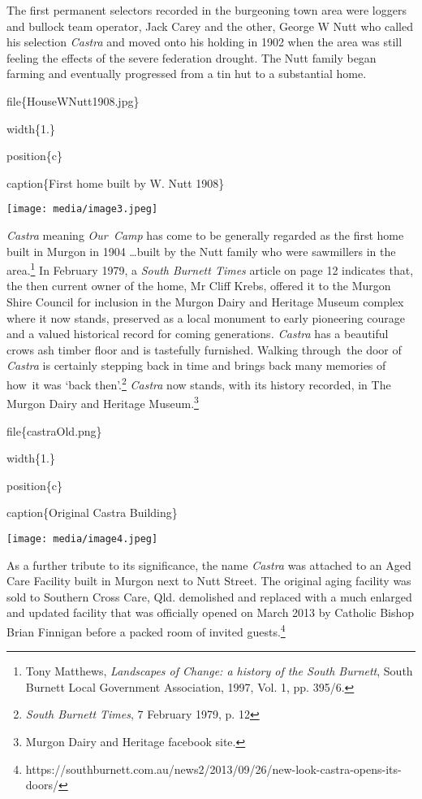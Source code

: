 The first permanent selectors recorded in the burgeoning town area were loggers and bullock team operator, Jack Carey and the other, George W Nutt who called his selection \emph{Castra} and moved onto his holding in 1902 when the area was still feeling the effects of the severe federation drought. The Nutt family began farming and eventually progressed from a tin hut to a substantial home.

file\{HouseWNutt1908.jpg\}

width\{1.\}

position\{c\}

caption\{First home built by W. Nutt 1908\}

\texttt{[image: media/image3.jpeg]}

\emph{Castra} meaning \emph{Our~Camp} has come to be generally regarded as the first home built in Murgon in 1904 \ldots built by the Nutt family who were sawmillers in the area.\footnote{Tony Matthews, \emph{Landscapes of Change: a history of the South Burnett}, South Burnett Local Government Association, 1997, Vol. 1, pp. 395/6.} In February 1979, a \emph{South Burnett Times} article on page 12 indicates that, the then current owner of the home, Mr Cliff Krebs, offered it to the Murgon Shire Council for inclusion in the Murgon Dairy and Heritage Museum complex where it now stands, preserved as a local monument to early pioneering courage and a valued historical record for coming generations\emph{. Castra} has a beautiful crows ash timber floor and is tastefully furnished. Walking through~the door of \emph{Castra} is certainly stepping back in time and brings back many memories of how~it was `back then'.\footnote{\emph{South Burnett Times}, 7 February 1979, p. 12} \emph{Castra} now stands, with its history recorded, in The Murgon Dairy and Heritage Museum.\footnote{Murgon Dairy and Heritage facebook site.}

file\{castraOld.png\}

width\{1.\}

position\{c\}

caption\{Original Castra Building\}

\texttt{[image: media/image4.jpeg]}

As a further tribute to its significance, the name \emph{Castra} was attached to an Aged Care Facility built in Murgon next to Nutt Street. The original aging facility was sold to Southern Cross Care, Qld. demolished and replaced with a much enlarged and updated facility that was officially opened on March 2013 by Catholic Bishop Brian Finnigan before a packed room of invited guests.\footnote{https://southburnett.com.au/news2/2013/09/26/new-look-castra-opens-its-doors/}

